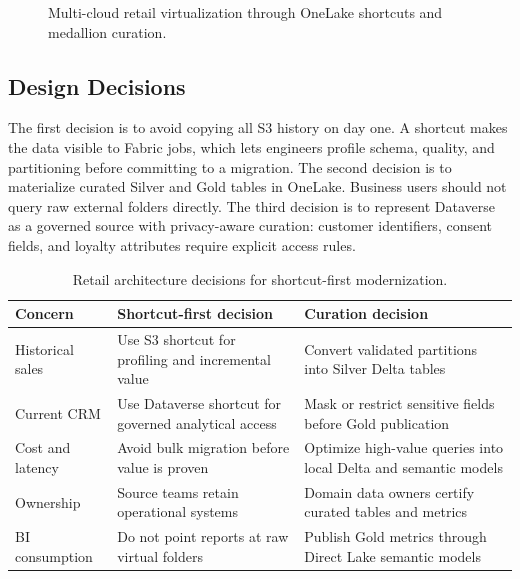 \begin{figure}[H]
{%
    }
    \caption{Multi-cloud retail virtualization through OneLake shortcuts and medallion curation.}
    \label{fig:chapter1-retail-virtualization}
\end{figure}

\subsection{Design Decisions}
The first decision is to avoid copying all S3 history on day one. A shortcut makes the data visible to Fabric jobs, which lets engineers profile schema, quality, and partitioning before committing to a migration. The second decision is to materialize curated Silver and Gold tables in OneLake. Business users should not query raw external folders directly. The third decision is to represent Dataverse as a governed source with privacy-aware curation: customer identifiers, consent fields, and loyalty attributes require explicit access rules.

\begin{table}[H]
\centering
\small
\begin{tabular}{@{}p{3.5cm}p{5.0cm}p{5.0cm}@{}}
\toprule
\textbf{Concern} & \textbf{Shortcut-first decision} & \textbf{Curation decision} \\
\midrule
Historical sales & Use S3 shortcut for profiling and incremental value & Convert validated partitions into Silver Delta tables \\
Current CRM & Use Dataverse shortcut for governed analytical access & Mask or restrict sensitive fields before Gold publication \\
Cost and latency & Avoid bulk migration before value is proven & Optimize high-value queries into local Delta and semantic models \\
Ownership & Source teams retain operational systems & Domain data owners certify curated tables and metrics \\
BI consumption & Do not point reports at raw virtual folders & Publish Gold metrics through Direct Lake semantic models \\
\bottomrule
\end{tabular}
\caption{Retail architecture decisions for shortcut-first modernization.}
\label{tab:chapter1-retail-decisions}
\end{table}

